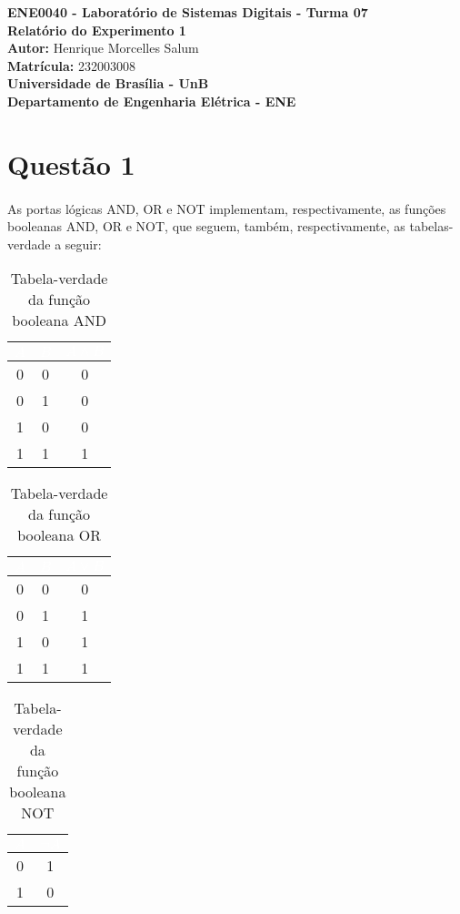 \documentclass[a4paper, 12pt]{article}
\newcommand{\capa}{
    \begin{titlepage}
        \begin{center}
            {\large \textbf{ENE0040 - Laboratório de Sistemas Digitais - Turma 07}} \\
            \vspace{3cm}
            {\Huge \textbf{Relatório do Experimento 1}} \\[1em]
            {\large \textbf{Autor:} Henrique Morcelles Salum} \\[0.5em]
            {\large \textbf{Matrícula:} 232003008} \\
            \vfill
            {\Large \textbf{Universidade de Brasília - UnB}} \\[0.75em]
            {\large \textbf{Departamento de Engenharia Elétrica - ENE}} \\
        \end{center}
    \end{titlepage}
}
\begin{document}
\capa

\newpage
\tableofcontents
\newpage

\section{Questão 1}
\paragraph{}
As portas lógicas AND, OR e NOT implementam, respectivamente, as funções booleanas AND, OR e NOT, que seguem, também, respectivamente, as tabelas-verdade a seguir:

\begin{table}[H]
    \centering
    \begin{tabular}{|c|c|c|}
        \hline
        \rowcolor{black}
        \textcolor{white}{$A$} & \textcolor{white}{$B$} & \textcolor{white}{$A \land B$} \\ \hline
        0 & 0 & 0 \\ \hline
        \rowcolor{lightgray}
        0 & 1 & 0 \\ \hline
        1 & 0 & 0 \\ \hline
        \rowcolor{lightgray}
        1 & 1 & 1 \\ \hline
    \end{tabular}
    \caption{Tabela-verdade da função booleana AND}
\end{table}

\begin{table}[H]
    \centering
    \begin{tabular}{|c|c|c|}
        \hline
        \rowcolor{black}
        \textcolor{white}{$A$} & \textcolor{white}{$B$} & \textcolor{white}{$A \lor B$} \\ \hline
        0 & 0 & 0 \\ \hline
        \rowcolor{lightgray}
        0 & 1 & 1 \\ \hline
        1 & 0 & 1 \\ \hline
        \rowcolor{lightgray}
        1 & 1 & 1 \\ \hline
    \end{tabular}
    \caption{Tabela-verdade da função booleana OR}
\end{table}

\begin{table}[H]
    \centering
    \begin{tabular}{|c|c|}
        \hline
        \rowcolor{black}
        \textcolor{white}{$A$} & \textcolor{white}{$\neg A$} \\ \hline
        0 & 1 \\ \hline
        \rowcolor{lightgray}
        1 & 0 \\ \hline
    \end{tabular}
    \caption{Tabela-verdade da função booleana NOT}
\end{table}
\end{document}
